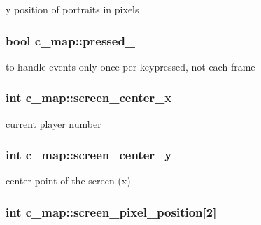 y position of portraits in pixels \hypertarget{classc__map_a0d69618264aff3f1b167d4fc3bb5ceb3}{
\subsubsection[{pressed\-\_\-2}]{\setlength{\rightskip}{0pt plus 5cm}bool c\-\_\-map\-::pressed\-\_\hspace{0.3cm}{\ttfamily [protected]}}}\label{classc__map_a0d69618264aff3f1b167d4fc3bb5ceb3}
to handle events only once per keypressed, not each frame \hypertarget{classc__map_a1fb9429d0318c721540dbe6337615cff}{
\subsubsection[{screen\-\_\-center\-\_\-x}]{\setlength{\rightskip}{0pt plus 5cm}int c\-\_\-map\-::screen\-\_\-center\-\_\-x\hspace{0.3cm}{\ttfamily [protected]}}}\label{classc__map_a1fb9429d0318c721540dbe6337615cff}
current player number \hypertarget{classc__map_a060e812813124210995493d10bc873d0}{
\subsubsection[{screen\-\_\-center\-\_\-y}]{\setlength{\rightskip}{0pt plus 5cm}int c\-\_\-map\-::screen\-\_\-center\-\_\-y\hspace{0.3cm}{\ttfamily [protected]}}}\label{classc__map_a060e812813124210995493d10bc873d0}
center point of the screen (x) \hypertarget{classc__map_afa78589723b061e99ecfe9f7ae9a5fdd}{
\subsubsection[{screen\-\_\-pixel\-\_\-position}]{\setlength{\rightskip}{0pt plus 5cm}int c\-\_\-map\-::screen\-\_\-pixel\-\_\-position\mbox{[}2\mbox{]}\hspace{0.3cm}{\ttfamily [protected]}}}\label{classc__map_afa78589723b061e99ecfe9f7ae9a5fdd}
